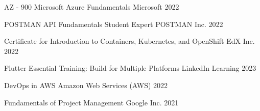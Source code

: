 

\begin{cvhonors}

  \cvhonor
    {AZ - 900 Microsoft Azure Fundamentals} %
    {Microsoft} %
    {} %
    {2022} %

  \cvhonor
    {POSTMAN API Fundamentals Student Expert}
    {POSTMAN Inc.}
    {} %
    {2022} %

\cvhonor
    {Certificate for Introduction to Containers, Kubernetes, and OpenShift} %
    {EdX Inc.}
    {} %
    {2022} %

\cvhonor
    {Flutter Essential Training: Build for Multiple Platforms} %
    {LinkedIn Learning}
    {} %
    {2023} %

  \cvhonor
    {DevOps in AWS} %
    {Amazon Web Services (AWS)} %
    {} %
    {2022} %

  \cvhonor
    {Fundamentals of Project Management} %
    {Google Inc.}
    {} %
    {2021} %

\end{cvhonors}
